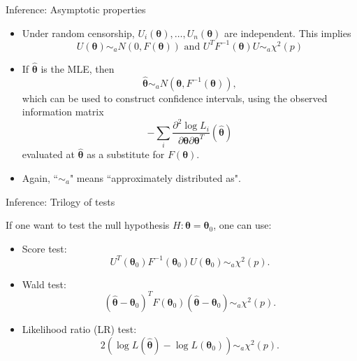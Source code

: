\documentclass{beamer}
\newcommand{\boldtheta}{{\boldsymbol \theta}}
\begin{document}
\begin{frame} {Inference: Asymptotic properties}
\begin{itemize} 
\item Under random censorship, $U_i(\boldtheta), \dots, U_n(\boldtheta)$ are independent. This implies
\[
U (\boldtheta)  \sim_a N(  0, F(\boldtheta)) \text{ and } U^T F^{-1} (\boldtheta) U \sim_a \chi^2(p)
\]

\item If $\hat{\boldtheta}$ is the MLE, then 
\[
\hat{\boldtheta} \sim_a N(\boldtheta, F^{-1}(\boldtheta)), 
\]
which can be used to construct confidence intervals, using  the observed information matrix
\[
- \sum_i \frac{\partial^2 \log L_i}{ \partial \boldtheta \partial \boldtheta^T} (\hat{\boldtheta})
\]
evaluated at $\hat{\boldtheta}$ as a substitute for  $F(\boldtheta)$. 

\item Again, ``$\sim_a$" means ``approximately distributed as".
\end{itemize}
\end{frame}



\begin{frame} {Inference: Trilogy of tests}


If one want to test the null hypothesis $H: \boldtheta = \boldtheta_0$, one can use:
\begin{itemize}
\item  Score test:
\[   U^T(\boldtheta_0) F^{-1} (\boldtheta_0) U(\boldtheta_0) \sim_a \chi^2 (p) .\]



\item Wald test:
\[   (\hat{\boldtheta} - \boldtheta_0)^T F(\boldtheta_0) (\hat{\boldtheta} - \boldtheta_0) \sim_a \chi^2 (p) .\]

\item Likelihood ratio (LR) test:
\[
2(\log L(\hat{\boldtheta}) -  \log L(\boldtheta_0)  )   \sim_a \chi^2 (p) .
\]


\end{itemize}
\end{frame}
\end{document}
